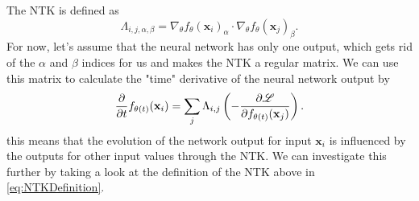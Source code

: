 The NTK is defined as 
\begin{equation}\label{eq:NTKDefinition}
	\Lambda_{i,j,\alpha,\beta} = \nabla_\theta f_\theta(\mathbf{x}_i)_\alpha \cdot \nabla_\theta f_\theta(\mathbf{x}_j)_\beta.
\end{equation}
For now, let's assume that the neural network has only one output, which gets rid of the $\alpha$ and $\beta$ indices for us and makes the NTK a regular matrix. We can use this matrix to calculate the "time" derivative of the neural network output by 
\begin{equation}\label{eq:NTKExplanation}
	\frac{\partial}{\partial t}f_{\theta(t)}(\mathbf{x}_i) = \sum_j \Lambda_{i,j} \left(- \frac{\partial\mathscr{L}}{\partial f_{\theta(t)}(\mathbf{x}_j)}\right).
\end{equation}
this means that the evolution of the network output for input $\mathbf{x}_i$ is influenced by the outputs for other input values through the NTK. We can investigate this further by taking a look at the definition of the NTK above in \cref{eq:NTKDefinition}. \\

